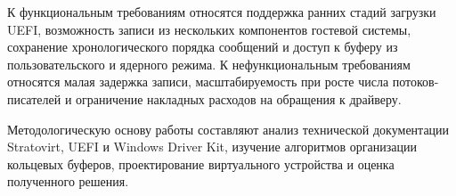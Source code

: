 К функциональным требованиям относятся поддержка ранних стадий загрузки UEFI,
возможность записи из нескольких компонентов гостевой системы, сохранение
хронологического порядка сообщений и доступ к буферу из пользовательского и
ядерного режима. К нефункциональным требованиям относятся малая задержка записи,
масштабируемость при росте числа потоков-писателей и ограничение накладных
расходов на обращения к драйверу.

Методологическую основу работы составляют анализ технической документации
Stratovirt, UEFI и Windows Driver Kit, изучение алгоритмов организации
кольцевых буферов, проектирование виртуального устройства и оценка полученного
решения.
